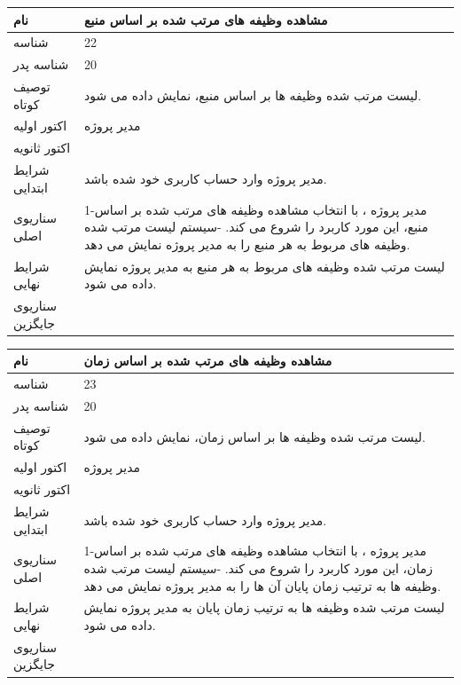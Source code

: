\vspace{2cm}

\begin{tabular}{|p{2cm}|p{10cm}|}
\hline
نام
&
مشاهده وظیفه های مرتب شده بر اساس منبع
\\
\hline
شناسه
&
22
\\
\hline
شناسه پدر
&
20
\\
\hline
توصیف کوتاه  
&
لیست مرتب شده وظیفه ها بر اساس منبع، نمایش داده می شود.
\\
\hline
اکتور اولیه
&
مدیر پروژه
\\
\hline
اکتور ثانویه
&

\\
\hline
شرایط ابتدایی
&
مدیر پروژه وارد حساب کاربری خود شده باشد. 
\\
\hline
سناریوی اصلی
&
1-مدیر پروژه ، با انتخاب مشاهده وظیفه های مرتب شده بر اساس منبع، این مورد کاربرد را شروع می کند.
\newline
2-سیستم لیست مرتب شده وظیفه های مربوط به هر منبع را به مدیر پروژه نمایش می دهد.
\\
\hline
شرایط نهایی
&
لیست مرتب شده وظیفه های مربوط به هر منبع به مدیر پروژه نمایش داده می شود.
\\
\hline
سناریوی جایگزین
&

\\
\hline
\end{tabular}

\vspace{2cm}

\begin{tabular}{|p{2cm}|p{10cm}|}
\hline
نام
&
مشاهده وظیفه های مرتب شده بر اساس زمان\\
\hline
شناسه
&
23
\\
\hline
شناسه پدر
&
20
\\
\hline
توصیف کوتاه  
&
لیست مرتب شده وظیفه ها بر اساس زمان، نمایش داده می شود.
\\
\hline
اکتور اولیه
&
مدیر پروژه
\\
\hline
اکتور ثانویه
&

\\
\hline
شرایط ابتدایی
&
مدیر پروژه وارد حساب کاربری خود شده باشد. 
\\
\hline
سناریوی اصلی
&
1-مدیر پروژه ، با انتخاب مشاهده وظیفه های مرتب شده بر اساس زمان، این مورد کاربرد را شروع می کند.
\newline
2-سیستم لیست مرتب شده وظیفه ها به ترتیب زمان پایان  آن ها  را به مدیر پروژه نمایش می دهد.
\\
\hline
شرایط نهایی
&
لیست مرتب شده وظیفه ها به ترتیب زمان پایان به مدیر پروژه نمایش داده می شود.
\\
\hline
سناریوی جایگزین
&

\\
\hline
\end{tabular}

